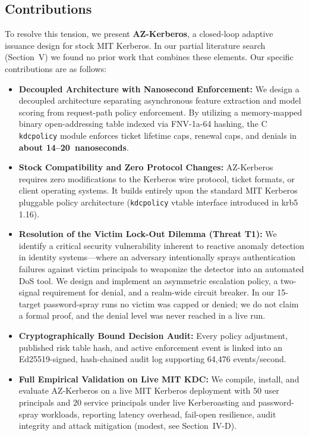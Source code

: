 \documentclass[conference]{IEEEtran}
\begin{document}
\subsection{Contributions}
To resolve this tension, we present \textbf{AZ-Kerberos}, a closed-loop adaptive issuance design for stock MIT Kerberos. In our partial literature search (Section~V) we found no prior work that combines these elements. Our specific contributions are as follows:
\begin{itemize}
    \item \textbf{Decoupled Architecture with Nanosecond Enforcement:} We design a decoupled architecture separating asynchronous feature extraction and model scoring from request-path policy enforcement. By utilizing a memory-mapped binary open-addressing table indexed via FNV-1a-64 hashing, the C \texttt{kdcpolicy} module enforces ticket lifetime caps, renewal caps, and denials in \textbf{about 14--20~nanoseconds}.
    \item \textbf{Stock Compatibility and Zero Protocol Changes:} AZ-Kerberos requires zero modifications to the Kerberos wire protocol, ticket formats, or client operating systems. It builds entirely upon the standard MIT Kerberos pluggable policy architecture (\texttt{kdcpolicy} vtable interface introduced in krb5 1.16).
    \item \textbf{Resolution of the Victim Lock-Out Dilemma (Threat T1):} We identify a critical security vulnerability inherent to reactive anomaly detection in identity systems---where an adversary intentionally sprays authentication failures against victim principals to weaponize the detector into an automated DoS tool. We design and implement an asymmetric escalation policy, a two-signal requirement for denial, and a realm-wide circuit breaker. In our 15-target password-spray runs no victim was capped or denied; we do not claim a formal proof, and the denial level was never reached in a live run.
    \item \textbf{Cryptographically Bound Decision Audit:} Every policy adjustment, published risk table hash, and active enforcement event is linked into an Ed25519-signed, hash-chained audit log supporting 64,476 events/second.
    \item \textbf{Full Empirical Validation on Live MIT KDC:} We compile, install, and evaluate AZ-Kerberos on a live MIT Kerberos deployment with 50 user principals and 20 service principals under live Kerberoasting and password-spray workloads, reporting latency overhead, fail-open resilience, audit integrity and attack mitigation (modest, see Section~IV-D).
\end{itemize}
\end{document}
